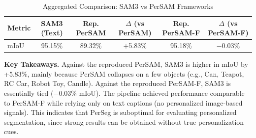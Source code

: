 \documentclass[journal,12pt,onecolumn,draftclsnofoot]{IEEEtran}
\begin{document}
\begin{table}[htbp]
\centering
\caption{Aggregated Comparison: SAM3 vs PerSAM Frameworks}
\label{tab:sam3_comparison}
\begin{tabular}{l c | c c | c c}
\toprule
\textbf{Metric} & \textbf{SAM3 (Text)} & \textbf{Rep. PerSAM} & \textbf{$\Delta$ (vs PerSAM)} & \textbf{Rep. PerSAM-F} & \textbf{$\Delta$ (vs PerSAM-F)} \\
\midrule
mIoU & 95.15\% & 89.32\% & +5.83\% & 95.18\% & $-0.03\%$ \\
\bottomrule
\end{tabular}
\end{table}

\textbf{Key Takeaways.} Against the reproduced PerSAM, SAM3 is higher in mIoU by +5.83\%, mainly because PerSAM collapses on a few objects (e.g., Can, Teapot, RC Car, Robot Toy, Candle). Against the reproduced PerSAM-F, SAM3 is essentially tied ($-0.03\%$ mIoU). The pipeline achieved performance comparable to PerSAM-F while relying only on text captions (no personalized image-based signals). This indicates that PerSeg is suboptimal for evaluating personalized segmentation, since strong results can be obtained without true personalization cues.
\end{document}
